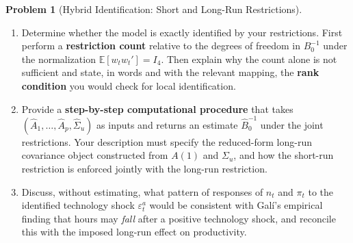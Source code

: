 \documentclass[12pt]{article}
\newcommand{\E}{\mathbb E}
\theoremstyle{definition} %
\newtheorem{problem}{Problem}
\theoremstyle{plain}
\begin{document}
\begin{problem}[Hybrid Identification: Short and Long-Run Restrictions]
\begin{enumerate}[label=(\alph*)]
\item Determine whether the model is exactly identified by your restrictions. First perform a \textbf{restriction count} relative to the degrees of freedom in $B_0^{-1}$ under the normalization $\E[w_t w_t'] = I_4$. Then explain why the count alone is not sufficient and state, in words and with the relevant mapping, the \textbf{rank condition} you would check for local identification.

\item Provide a \textbf{step-by-step computational procedure} that takes $(\widehat{A}_1,\ldots,\widehat{A}_p,\widehat{\Sigma}_u)$ as inputs and returns an estimate $\widehat{B}_0^{-1}$ under the joint restrictions. Your description must specify the reduced-form long-run covariance object constructed from $A(1)$ and $\Sigma_u$, and how the short-run restriction is enforced jointly with the long-run restriction.

\item Discuss, without estimating, what pattern of responses of $n_t$ and $\pi_t$ to the identified technology shock $\varepsilon_t^a$ would be consistent with Galí's empirical finding that hours may \emph{fall} after a positive technology shock, and reconcile this with the imposed long-run effect on productivity.
\end{enumerate}
\end{problem}

\vspace{0.8em}
\end{document}
